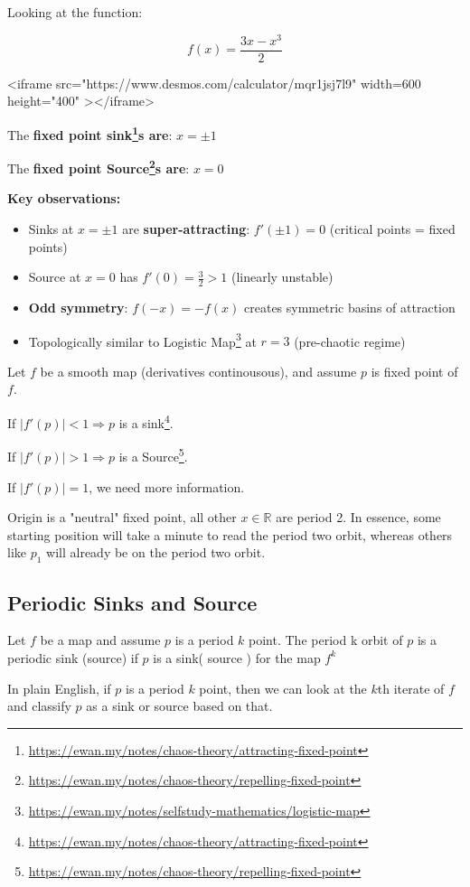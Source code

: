 \documentclass[11pt,a4paper]{article}
\begin{document}
Looking at the function:

\[
f(x) = \frac{3x-x^3}{2}
\]

\begin{infobox}[Desmos]

<iframe src="https://www.desmos.com/calculator/mqr1jsj7l9" width=600 height="400" ></iframe>
\end{infobox}

The \textbf{fixed point sink\footnote{\url{https://ewan.my/notes/chaos-theory/attracting-fixed-point}}s are}: $x = \pm 1$

The \textbf{fixed point Source\footnote{\url{https://ewan.my/notes/chaos-theory/repelling-fixed-point}}s are}: $x=0$

\textbf{Key observations:}

\begin{itemize}
  \item Sinks at $x = \pm 1$ are \textbf{super-attracting}: $f'(\pm 1) = 0$ (critical points = fixed points)
  \item Source at $x = 0$ has $f'(0) = \frac{3}{2} > 1$ (linearly unstable)
  \item \textbf{Odd symmetry}: $f(-x) = -f(x)$ creates symmetric basins of attraction
  \item Topologically similar to Logistic Map\footnote{\url{https://ewan.my/notes/selfstudy-mathematics/logistic-map}} at $r=3$ (pre-chaotic regime)
\end{itemize}

\begin{abstractbox}[Theorem]

Let $f$ be a smooth map (derivatives continousous), and assume $p$ is fixed point of $f$.

If $|f'(p)| <1 \Rightarrow p$ is a sink\footnote{\url{https://ewan.my/notes/chaos-theory/attracting-fixed-point}}.

If $|f'(p)| > 1 \Rightarrow p$ is a Source\footnote{\url{https://ewan.my/notes/chaos-theory/repelling-fixed-point}}.

If $|f'(p)| =1$, we need more information.
\end{abstractbox}

Origin is a "neutral" fixed point, all other $x \in \mathbb{R}$ are period 2. In essence, some starting position will take a minute to read the period two orbit, whereas others like $p_{1}$ will already be on the period two orbit.

\hrulefill

\subsection{Periodic Sinks and Source}

\begin{displayquote}
Let $f$ be a map and assume $p$ is a period $k$ point. The period k orbit of $p$ is a periodic sink (source) if $p$ is a sink( source ) for the map $f^{k}$
\end{displayquote}

In plain English, if $p$ is a period $k$ point, then we can look at the $k$th iterate of $f$ and classify $p$ as a sink or source based on that.
\end{document}
